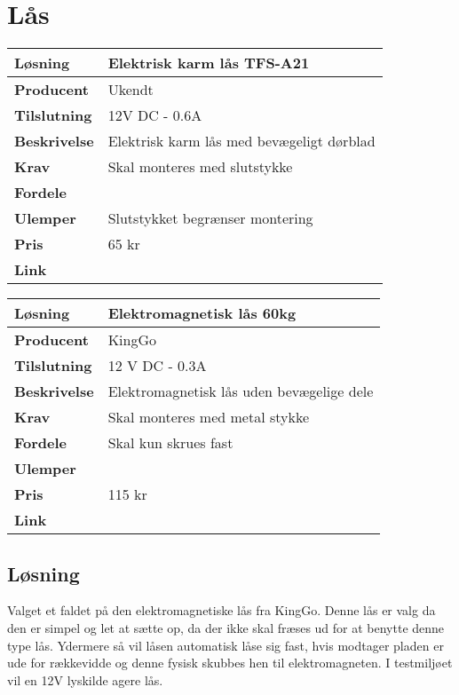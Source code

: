 
\begin{table}[!htbp] \centering
	\section{Lås}
	\label{tab:laas1}
\begin{tabular}{|p{6cm}|p{8cm}|}
	\hline
		\textbf{Løsning}				&Elektrisk karm lås TFS-A21 \\ \hline
		\textbf{Producent} 			&Ukendt \\ \hline
		\textbf{Tilslutning} 		&12V DC - 0.6A \\ \hline
		\textbf{Beskrivelse} 		&Elektrisk karm lås med bevægeligt dørblad \\ \hline
		\textbf{Krav} 				&Skal monteres med slutstykke \\ \hline
		\textbf{Fordele}				& \\ \hline
		\textbf{Ulemper} 			&Slutstykket begrænser montering \\ \hline
		\textbf{Pris} 				&65 kr \\ \hline
		\textbf{Link} 				& \\ \hline		
\end{tabular}
\end{table}

\begin{table}[!htbp] \centering
	\label{tab:laas2}
\begin{tabular}{|p{6cm}|p{8cm}|}
	\hline
		\textbf{Løsning}				&Elektromagnetisk lås 60kg \\ \hline
		\textbf{Producent} 			&KingGo \\ \hline
		\textbf{Tilslutning} 		&12 V DC - 0.3A\\ \hline
		\textbf{Beskrivelse} 		&Elektromagnetisk lås uden bevægelige dele \\ \hline
		\textbf{Krav} 				&Skal monteres med metal stykke \\ \hline
		\textbf{Fordele}				&Skal kun skrues fast \\ \hline
		\textbf{Ulemper} 			& \\ \hline
		\textbf{Pris} 				&115 kr \\ \hline
		\textbf{Link} 				&\\ \hline		
\end{tabular}
\end{table}

\subsection{Løsning}

Valget et faldet på den elektromagnetiske lås fra KingGo. Denne lås er valg da den er simpel og let at sætte op, da der ikke skal fræses ud for at benytte denne type lås. Ydermere så vil låsen automatisk låse sig fast, hvis modtager pladen er ude for rækkevidde og denne fysisk skubbes hen til elektromagneten. I testmiljøet vil en 12V lyskilde agere lås.